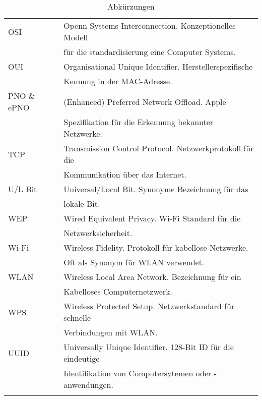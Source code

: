 \begin{longtable}{|l|l|}
    \hline
    OSI & Openn Systems Interconnection. Konzeptionelles Modell \\
    & für die standardisierung eine Computer Systems. \\
    \hline
    OUI & Organisational Unique Identifier. Herstellerspezifische \\
    & Kennung in der MAC-Adresse. \\
    \hline
    PNO \& ePNO & (Enhanced) Preferred Network Offload. Apple \\
    & Spezifikation für die Erkennung bekannter Netzwerke. \\
    \hline
    TCP & Transmission Control Protocol. Netzwerkprotokoll für die \\
    & Kommunikation über das Internet. \\
    \hline
    U/L Bit & Universal/Local Bit. Synonyme Bezeichnung für das \\
    & lokale Bit. \\
    \hline
    WEP & Wired Equivalent Privacy. Wi-Fi Standard für die \\
    & Netzwerksicherheit. \\
    \hline
    Wi-Fi & Wireless Fidelity. Protokoll für kabellose Netzwerke. \\
    & Oft als Synonym für WLAN verwendet. \\
    \hline
    WLAN & Wireless Local Area Network. Bezeichnung für ein \\ 
    & Kabelloses Computernetzwerk. \\
    \hline
    WPS & Wireless Protected Setup. Netzwerkstandard für schnelle \\
    & Verbindungen mit WLAN. \\
    \hline
    UUID & Universally Unique Identifier. 128-Bit ID für die eindeutige \\
    & Identifikation von Computersytemen oder -anwendungen. \\
    \hline
    \caption{Abkürzungen}  \label{table:abreviationsandglossary} \\
\end{longtable}

\clearpage 
